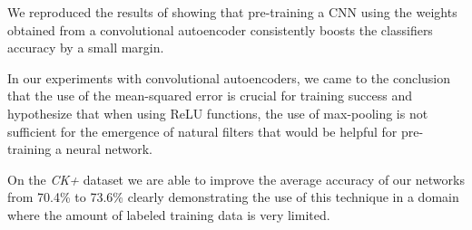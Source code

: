 \documentclass{article}
\begin{document}
  We reproduced the results of \citep{masci2011stacked} showing that pre-training a CNN using the weights obtained from a convolutional autoencoder consistently boosts the classifiers accuracy by a small margin. 

  In our experiments with convolutional autoencoders, we came to the conclusion that the use of the mean-squared error is crucial for training success and hypothesize that when using ReLU functions, the use of max-pooling is not sufficient for the emergence of natural filters that would be helpful for pre-training a neural network. 

  On the \emph{CK+} dataset we are able to improve the average accuracy of our networks from 70.4\% to 73.6\% clearly demonstrating the use of this technique in a domain where the amount of labeled training data is very limited. 



\clearpage
%
\printbibliography
\end{document}
